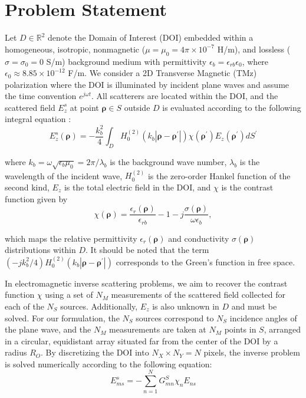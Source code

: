 \documentclass{IEEEtran}
\newcommand{\brho}{\boldsymbol{\rho}}
\newcommand{\brhop}{\boldsymbol{\rho^\prime}}
\begin{document}
        
	\section{Problem Statement}\label{sec:problemstatement}
		
		Let $D \in \mathbb{R}^2$ denote the Domain of Interest (DOI) embedded within a homogeneous, isotropic, nonmagnetic ($\mu = \mu_0 = 4\pi \times 10^{-7}$ H/m), and lossless ($\sigma = \sigma_0 = 0$ S/m) background medium with permittivity $\epsilon_b = \epsilon_{rb}\epsilon_0$, where $\epsilon_0 \approx 8.85 \times 10^{-12}$ F/m. We consider a 2D Transverse Magnetic (TMz) polarization where the DOI is illuminated by incident plane waves and assume the time convention $e^{j\omega t}$. All scatterers are located within the DOI, and the scattered field $E^s_z$ at point $\brho \in S$ outside $D$ is evaluated according to the following integral equation \cite{harrington2001time}:
		\begin{equation}
			E^s_z (\brho) = -\frac{k_b^2}{4} \int_D H_0^{(2)}(k_b|\brho-\brhop|)\chi(\brhop)E_z(\brhop) dS^\prime
		\end{equation}
		
		\noindent where $k_b = \omega\sqrt{\epsilon_b\mu_0} = 2\pi/\lambda_b$ is the background wave number, $\lambda_b$ is the wavelength of the incident wave, $H_0^{(2)}$ is the zero-order Hankel function of the second kind, $E_z$ is the total electric field in the DOI, and $\chi$ is the contrast function given by
		\begin{equation}
			\chi(\brho) = \frac{\epsilon_r(\brho)}{\epsilon_{rb}} - 1 - j\frac{\sigma(\brho)}{\omega\epsilon_b},
		\end{equation}
		
		\noindent which maps the relative permittivity $\epsilon_r(\brho)$ and conductivity $\sigma(\brho)$ distributions within $D$. It should be noted that the term $(-jk_b^2/4) H_0^{(2)}(k_b|\brho-\brhop|)$ corresponds to the Green's function in free space.
		
		In electromagnetic inverse scattering problems, we aim to recover the contrast function $\chi$ using a set of $N_M$ measurements of the scattered field collected for each of the $N_S$ sources. Additionally, $E_z$ is also unknown in $D$ and must be solved. For our formulation, the $N_S$ sources correspond to $N_S$ incidence angles of the plane wave, and the $N_M$ measurements are taken at $N_M$ points in $S$, arranged in a circular, equidistant array situated far from the center of the DOI by a radius $R_O$. By discretizing the DOI into $N_X \times N_Y = N$ pixels, the inverse problem is solved numerically according to the following equation:
		\begin{equation}
			E^s_{ms} = - \sum\limits_{n=1}^{N} G^S_{mn}\chi_{n}E_{ns} \label{eq:numerical}
		\end{equation}
		
\end{document}

